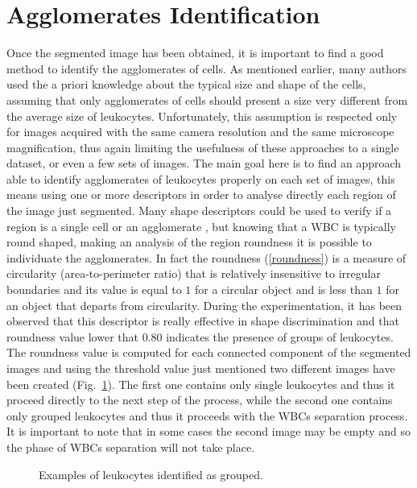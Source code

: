 \documentclass[final,a4paper,12pt,english]{UnicaPhdThesis3}
\begin{document}
	\section{Agglomerates Identification}
	Once the segmented image has been obtained, it is important to find a good method to identify the agglomerates of cells. As mentioned earlier, many authors used the a priori knowledge about the typical size and shape of the cells, assuming that only agglomerates of cells should present a size very different from the average size of leukocytes. Unfortunately, this assumption is respected only for images acquired with the same camera resolution and the same microscope magnification, thus again limiting the usefulness of these approaches to a single dataset, or even a few sets of images. The main goal here is to find an approach able to identify agglomerates of leukocytes properly on each set of images, this means using one or more descriptors in order to analyse directly each region of the image just segmented. Many shape descriptors could be used to verify if a region is a single cell or an agglomerate \cite{Gonz}, but knowing that a WBC is typically round shaped, making an analysis of the region roundness it is possible to individuate the agglomerates. In fact the roundness (\ref{roundness}) is a measure of circularity (area-to-perimeter ratio) that is relatively insensitive to irregular boundaries and its value is equal to $1$ for a circular object and is less than $1$ for an object that departs from circularity. During the experimentation, it has been observed that this descriptor is really effective in shape discrimination and that roundness value lower that $0.80$ indicates the presence of groups of leukocytes. The roundness value is computed for each connected component of the segmented images and using the threshold value just mentioned two different images have been created (Fig.~\ref{fig:example10}). The first one contains only single leukocytes and thus it proceed directly to the next step of the process, while the second one contains only grouped leukocytes and thus it proceeds with the WBCs separation process. It is important to note that in some cases the second image may be empty and so the phase of WBCs separation will not take place.	
	
	\begin{figure}[!htbp]
		\centering
		\caption{\label{fig:example10}Examples of leukocytes identified as grouped.}
	\end{figure}
	
\end{document}

